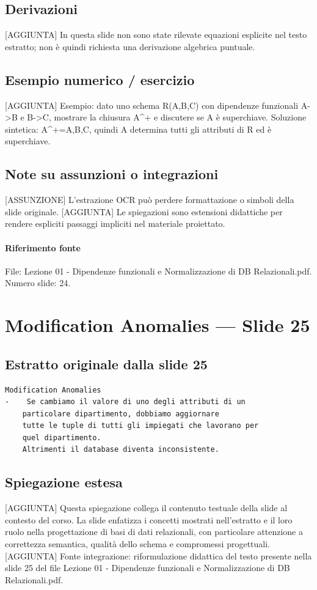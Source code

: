 \documentclass[11pt]{article}
\begin{document}
\subsection*{Derivazioni}
[AGGIUNTA] In questa slide non sono state rilevate equazioni esplicite nel testo estratto; non è quindi richiesta una derivazione algebrica puntuale.
\subsection*{Esempio numerico / esercizio}
[AGGIUNTA] Esempio: dato uno schema R(A,B,C) con dipendenze funzionali A->B e B->C, mostrare la chiusura A^+ e discutere se A è superchiave. Soluzione sintetica: A^+={A,B,C}, quindi A determina tutti gli attributi di R ed è superchiave.
\subsection*{Note su assunzioni o integrazioni}
[ASSUNZIONE] L'estrazione OCR può perdere formattazione o simboli della slide originale.
[AGGIUNTA] Le spiegazioni sono estensioni didattiche per rendere espliciti passaggi impliciti nel materiale proiettato.
\paragraph{Riferimento fonte} File: Lezione 01 - Dipendenze funzionali e Normalizzazione di DB Relazionali.pdf. Numero slide: 24.
\section{Modification Anomalies --- Slide 25}
\subsection*{Estratto originale dalla slide 25}
\begin{lstlisting}
Modification Anomalies
-    Se cambiamo il valore di uno degli attributi di un
    particolare dipartimento, dobbiamo aggiornare
    tutte le tuple di tutti gli impiegati che lavorano per
    quel dipartimento.
    Altrimenti il database diventa inconsistente.
\end{lstlisting}
\subsection*{Spiegazione estesa}
[AGGIUNTA] Questa spiegazione collega il contenuto testuale della slide al contesto del corso. La slide enfatizza i concetti mostrati nell'estratto e il loro ruolo nella progettazione di basi di dati relazionali, con particolare attenzione a correttezza semantica, qualità dello schema e compromessi progettuali.
[AGGIUNTA] Fonte integrazione: riformulazione didattica del testo presente nella slide 25 del file Lezione 01 - Dipendenze funzionali e Normalizzazione di DB Relazionali.pdf.
\end{document}
